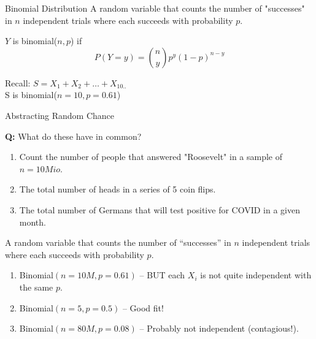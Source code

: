 \documentclass[aspectratio=169]{../latex_main/tntbeamer}  %
\begin{document}
\begin{frame}{Binomial Distribution}
    A random variable that counts the number of "successes" in $n$ independent trials where each succeeds with probability $p$.

    $Y$ is binomial($n,p$) if 
    $$P(Y=y) = \binom{n}{y}p^y(1-p)^{n-y}$$

    Recall: $S = X_1 + X_2 + \ldots + X_{10..}$\\
    S is binomial($n=10, p=0.61$)
\end{frame}

\begin{frame}{Abstracting Random Chance}

    \textbf{Q:} What do these have in common?\\

    \begin{enumerate}
        \item Count the number of people that answered "Roosevelt" in a sample of $n = 10Mio$.
        \item The total number of heads in a series of 5 coin flips.
        \item The total number of Germans that will test positive for COVID in a given month.
    \end{enumerate}


    A random variable that counts the number of “successes” in $n$ independent trials where each succeeds with probability $p$.
    
    \begin{enumerate}
        \item Binomial$(n = 10M, p = 0.61)$ – BUT each $X_i$ is not quite independent with the same $p$.
        \item Binomial$(n = 5, p = 0.5)$ – Good fit!
        \item Binomial$(n = 80M, p = 0.08)$ – Probably not independent (contagious!).
    \end{enumerate}
\end{frame}
\end{document}
